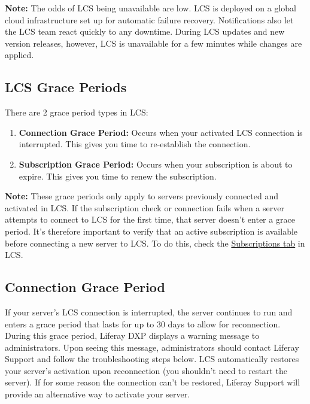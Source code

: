 \noindent\hrulefill

\textbf{Note:} The odds of LCS being unavailable are low. LCS is
deployed on a global cloud infrastructure set up for automatic failure
recovery. Notifications also let the LCS team react quickly to any
downtime. During LCS updates and new version releases, however, LCS is
unavailable for a few minutes while changes are applied.

\noindent\hrulefill

\subsection{LCS Grace Periods}\label{lcs-grace-periods}

There are 2 grace period types in LCS:

\begin{enumerate}
\def\labelenumi{\arabic{enumi}.}
\item
  \textbf{Connection Grace Period:} Occurs when your activated LCS
  connection is interrupted. This gives you time to re-establish the
  connection.
\item
  \textbf{Subscription Grace Period:} Occurs when your subscription is
  about to expire. This gives you time to renew the subscription.
\end{enumerate}

\noindent\hrulefill

\textbf{Note:} These grace periods only apply to servers previously
connected and activated in LCS. If the subscription check or connection
fails when a server attempts to connect to LCS for the first time, that
server doesn't enter a grace period. It's therefore important to verify
that an active subscription is available before connecting a new server
to LCS. To do this, check the
\href{/docs/7-0/deploy/-/knowledge_base/d/using-lcs\#managing-liferay-dxp-subscriptions}{Subscriptions
tab} in LCS.

\noindent\hrulefill

\subsection{Connection Grace Period}\label{connection-grace-period}

If your server's LCS connection is interrupted, the server continues to
run and enters a grace period that lasts for up to 30 days to allow for
reconnection. During this grace period, Liferay DXP displays a warning
message to administrators. Upon seeing this message, administrators
should contact Liferay Support and follow the troubleshooting steps
below. LCS automatically restores your server's activation upon
reconnection (you shouldn't need to restart the server). If for some
reason the connection can't be restored, Liferay Support will provide an
alternative way to activate your server.

